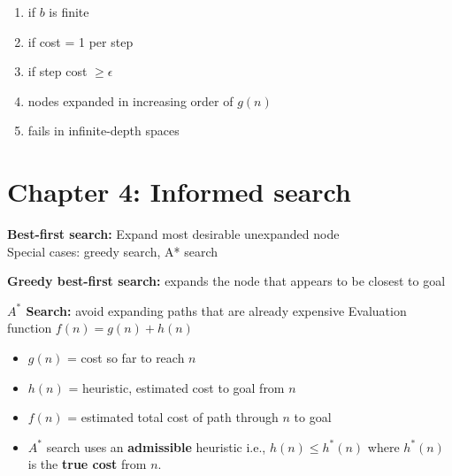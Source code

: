 \documentclass{../cheat}
\begin{document}
\begin{multicols}{3}
		
	\begin{enumerate}
		\item if $b$ is finite
		\item if cost = 1 per step
		\item if step cost $\geq \epsilon$
		\item nodes expanded in increasing order of $g(n)$
		\item fails in infinite-depth spaces
	\end{enumerate}
	





	\section{Chapter 4: Informed search}
		\textbf{Best-first search:} Expand most desirable unexpanded node\\
		Special cases: greedy search, A* search
		
		\textbf{Greedy best-first search:} expands the node that appears to be closest to goal
		
		\textbf{$A^*$ Search:} avoid expanding paths that are already expensive 
		Evaluation function $f(n) = g(n) + h(n)$
		\begin{itemize}
			\item $g(n)$ = cost so far to reach $n$
			\item $h(n)$ = heuristic, estimated cost to goal from $n$
			\item $f(n)$ = estimated total cost of path through $n$ to goal
			\item $A^*$ search uses an \textbf{admissible} heuristic i.e., $h(n) \leq h^*(n)$ where $h^*(n)$ is the \textbf{true cost} from $n$.
		\end{itemize}
		

\end{multicols}
\end{document}
